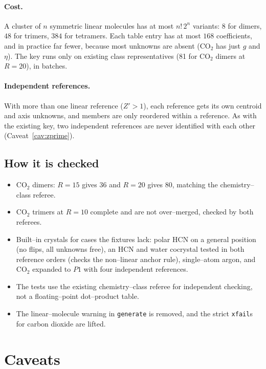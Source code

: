 \documentclass[11pt]{article}
\theoremstyle{definition}
\begin{document}
\paragraph{Cost.} A cluster of $n$ symmetric linear molecules has at most
$n!\,2^n$ variants: $8$ for dimers, $48$ for trimers, $384$ for tetramers. Each
table entry has at most $168$ coefficients, and in practice far fewer, because
most unknowns are absent (CO$_2$ has just $g$ and $\eta$). The key runs only on
existing class representatives (81 for CO$_2$ dimers at $R=20$), in batches.

\paragraph{Independent references.} With more than one linear reference
($Z'>1$), each reference gets its own centroid and axis unknowns, and members
are only reordered within a reference. As with the existing key, two
independent references are never identified with each other
(Caveat~\ref{cav:zprime}).

\subsection{How it is checked}

\begin{itemize}[leftmargin=2em]
\item CO$_2$ dimers: $R=15$ gives $36$ and $R=20$ gives $80$,
  matching the chemistry--class referee.
\item CO$_2$ trimers at $R=10$ complete and are not over--merged, checked by
  both referees.
\item Built--in crystals for cases the fixtures lack: polar HCN on a general
  position (no flips, all unknowns free), an HCN and water cocrystal tested in
  both reference orders (checks the non--linear anchor rule), single--atom
  argon, and CO$_2$ expanded to $P1$ with four independent references.
\item The tests use the existing chemistry--class referee for independent
  checking, not a floating--point dot--product table.
\item The linear--molecule warning in \texttt{generate} is removed, and the
  strict \texttt{xfail}s for carbon dioxide are lifted.
\end{itemize}

\section{Caveats}\label{sec:caveats}
\end{document}
